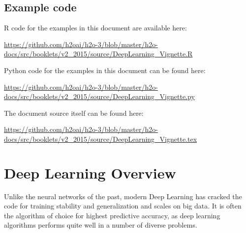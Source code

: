 \newcommand{\waterVersion}{3.0.1.4}


\subsection{Example code}

R code for the examples in this document are available here:

\url{https://github.com/h2oai/h2o-3/blob/master/h2o-docs/src/booklets/v2_2015/source/DeepLearning_Vignette.R}

Python code for the examples in this document can be found here:

\url{https://github.com/h2oai/h2o-3/blob/master/h2o-docs/src/booklets/v2_2015/source/DeepLearning_Vignette.py}

The document source itself can be found here:

\url{https://github.com/h2oai/h2o-3/blob/master/h2o-docs/src/booklets/v2_2015/source/DeepLearning_Vignette.tex}


\newpage
\section{Deep Learning Overview}
Unlike the neural networks of the past, modern Deep Learning has cracked the code for training stability and generalization and scales on big data.  It is often the algorithm of choice for highest predictive accuracy, as deep learning algorithms performs quite well in a number of diverse problems. 

